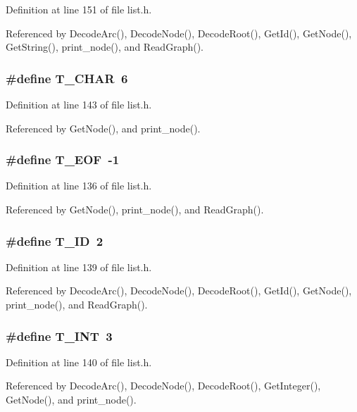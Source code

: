 Definition at line 151 of file list.h.

Referenced by Decode\-Arc(), Decode\-Node(), Decode\-Root(), Get\-Id(), Get\-Node(), Get\-String(), print\_\-node(), and Read\-Graph().
\subsubsection{\setlength{\rightskip}{0pt plus 5cm}\#define T\_\-CHAR~6}\label{list_8h_e2381f297a8fbb736886d7d1b6b99b42}




Definition at line 143 of file list.h.

Referenced by Get\-Node(), and print\_\-node().
\subsubsection{\setlength{\rightskip}{0pt plus 5cm}\#define T\_\-EOF~-1}\label{list_8h_11358e4c7a08383fa2da19854ab861da}




Definition at line 136 of file list.h.

Referenced by Get\-Node(), print\_\-node(), and Read\-Graph().
\subsubsection{\setlength{\rightskip}{0pt plus 5cm}\#define T\_\-ID~2}\label{list_8h_ed3b2f2399f013537ccf55078910619a}




Definition at line 139 of file list.h.

Referenced by Decode\-Arc(), Decode\-Node(), Decode\-Root(), Get\-Id(), Get\-Node(), print\_\-node(), and Read\-Graph().
\subsubsection{\setlength{\rightskip}{0pt plus 5cm}\#define T\_\-INT~3}\label{list_8h_4fa28a492427bc4af75248e22537e9b4}




Definition at line 140 of file list.h.

Referenced by Decode\-Arc(), Decode\-Node(), Decode\-Root(), Get\-Integer(), Get\-Node(), and print\_\-node().
